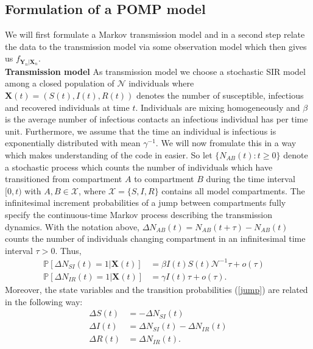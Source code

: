 \subsection{Formulation of a POMP model}
We will first formulate a Markov transmission model and in a second step relate the data to the transmission model via some observation model which then gives us $f_{\bm{Y}_n|\bm{X}_{n}}$. \\
\newline
\textbf{Transmission model} 
As transmission model we choose  a stochastic SIR model among a closed population of $\mathcal{N}$ individuals where  
$\bm{X}(t)=(S(t), I(t), R(t)) $ denotes the number of susceptible, infectious and recovered individuals at time $t$. Individuals are mixing homogeneously and $\beta$ is the average number of infectious contacts an infectious individual has per time unit. Furthermore, we assume that the time an individual is infectious is exponentially distributed with mean $\gamma ^{-1}$. 
We will now fromulate this in a way which makes understanding of the code  in \cite{theresa_git} easier. So  let  $\{N_{AB}(t): t \geq 0\}$  denote a stochastic process which counts the number of individuals which have  transitioned from compartment $A$ to compartment $B$ during the time interval $[0,t)$ with $A, B \in \mathcal{X}$, where $\mathcal{X}=\{S, I, R\}$ contains all model compartments. The infinitesimal increment probabilities of a jump between compartments fully specify the continuous-time Markov process describing the transmission dynamics. With the notation above,  $\Delta N_{AB}(t)=N_{AB}(t+\tau)-N_{AB}(t)$ counts the number of individuals changing compartment in an infinitesimal time interval $\tau>0$. Thus, 
 \begin{align}
\mathbb{P}[\Delta N_{SI}(t)=1 |\bm{X}(t)]&=  \beta I(t) S(t)\mathcal{N}^{-1}\tau +o(\tau) \quad \nonumber \\
\mathbb{P}[\Delta N_{IR}(t)=1 |\bm{X}(t)]&= \gamma I(t)\tau  +o(\tau). \quad\label{jump}
\end{align}
Moreover, the state variables and the transition probabilities (\ref{jump}) are  related in the following way:
\begin{align}
\Delta S(t)&= -\Delta N_{ SI}(t)  \nonumber\\
\Delta I(t)&= \Delta N_{ SI}(t)-\Delta N_{ IR}(t) \label{states}\\
\Delta R(t)&= \Delta N_{IR}(t). \nonumber
\end{align}
